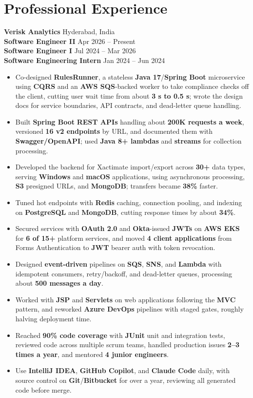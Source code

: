 \documentclass[a4paper,10pt]{article}
\begin{document}
\section*{Professional Experience}

\textbf{Verisk Analytics} \hfill Hyderabad, India \\
\textbf{Software Engineer II} \hfill Apr 2026 -- Present \\
\textbf{Software Engineer I} \hfill Jul 2024 -- Mar 2026 \\
\textbf{Software Engineering Intern} \hfill Jan 2024 -- Jun 2024

\begin{itemize}[leftmargin=*]
    \item Co-designed \textbf{RulesRunner}, a stateless \textbf{Java 17}/\textbf{Spring Boot} microservice using \textbf{CQRS} and an \textbf{AWS SQS}-backed worker to take compliance checks off the client, cutting user wait time from about \textbf{3 s to 0.5 s}; wrote the design docs for service boundaries, API contracts, and dead-letter queue handling.
    \item Built \textbf{Spring Boot} \textbf{REST APIs} handling about \textbf{200K requests a week}, versioned \textbf{16 v2 endpoints} by URL, and documented them with \textbf{Swagger/OpenAPI}; used \textbf{Java 8+ lambdas} and \textbf{streams} for collection processing.
    \item Developed the backend for Xactimate import/export across \textbf{30+} data types, serving \textbf{Windows} and \textbf{macOS} applications, using asynchronous processing, \textbf{S3} presigned URLs, and \textbf{MongoDB}; transfers became \textbf{38\%} faster.
    \item Tuned hot endpoints with \textbf{Redis} caching, connection pooling, and indexing on \textbf{PostgreSQL} and \textbf{MongoDB}, cutting response times by about \textbf{34\%}.
    \item Secured services with \textbf{OAuth 2.0} and \textbf{Okta}-issued \textbf{JWTs} on \textbf{AWS EKS} for \textbf{6 of 15+} platform services, and moved \textbf{4 client applications} from Forms Authentication to \textbf{JWT} bearer auth with token revocation.
    \item Designed \textbf{event-driven} pipelines on \textbf{SQS}, \textbf{SNS}, and \textbf{Lambda} with idempotent consumers, retry/backoff, and dead-letter queues, processing about \textbf{500 messages a day}.
    \item Worked with \textbf{JSP} and \textbf{Servlets} on web applications following the \textbf{MVC} pattern, and reworked \textbf{Azure DevOps} pipelines with staged gates, roughly halving deployment time.
    \item Reached \textbf{90\% code coverage} with \textbf{JUnit} unit and integration tests, reviewed code across multiple scrum teams, handled production issues \textbf{2--3 times a year}, and mentored \textbf{4 junior engineers}.
    \item Use \textbf{IntelliJ IDEA}, \textbf{GitHub Copilot}, and \textbf{Claude Code} daily, with source control on \textbf{Git}/\textbf{Bitbucket} for over a year, reviewing all generated code before merge.
\end{itemize}
\end{document}
